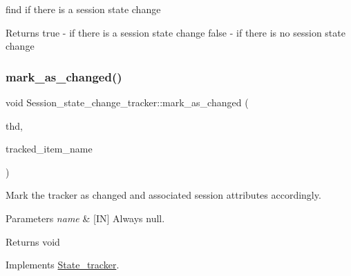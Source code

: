 find if there is a session state change 

\begin{DoxyReturn}{Returns}
true -\/ if there is a session state change false -\/ if there is no session state change 
\end{DoxyReturn}
\mbox{\label{classSession__state__change__tracker_a584fe743f65ba30c3edcde930eb17d16}} 
\subsubsection{\texorpdfstring{mark\+\_\+as\+\_\+changed()}{mark\_as\_changed()}}
{\footnotesize\ttfamily void Session\+\_\+state\+\_\+change\+\_\+tracker\+::mark\+\_\+as\+\_\+changed (\begin{DoxyParamCaption}\item[{T\+HD $\ast$}]{thd,  }\item[{L\+E\+X\+\_\+\+C\+S\+T\+R\+I\+NG $\ast$}]{tracked\+\_\+item\+\_\+name }\end{DoxyParamCaption})\hspace{0.3cm}{\ttfamily [virtual]}}



Mark the tracker as changed and associated session attributes accordingly. 


\begin{DoxyParams}{Parameters}
{\em name} & \mbox{[}IN\mbox{]} Always null. \\
\hline
\end{DoxyParams}
\begin{DoxyReturn}{Returns}
void 
\end{DoxyReturn}


Implements \mbox{\hyperlink{classState__tracker_afb865d3837c0f8fc9cd36d5234142b32}{State\+\_\+tracker}}.

\mbox{\label{classSession__state__change__tracker_abd748697d89b7c7146b64438db0b404e}} 
